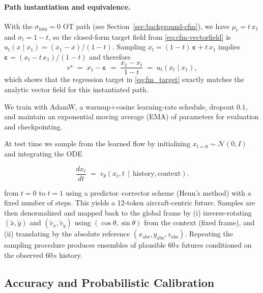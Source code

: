 \documentclass[
  manuscript=proceedings,  %
  layout=preprint,  %
  year=20xx,
  volume=x,
]{extra/joas}
\begin{document}
\paragraph{Path instantiation and equivalence.}
With the $\sigma_{\min}{=}0$ OT path (see Section~\ref{sec:background-cfm}), we have $\mu_t{=}t\,x_1$ and $\sigma_t{=}1{-}t$, so the closed-form target field from \eqref{eq:cfm-vectorfield} is $u_t(x\mid x_1){=}(x_1{-}x)/(1{-}t)$. Sampling $x_t{=}(1{-}t)\,\boldsymbol{\varepsilon}+t\,x_1$ implies $\boldsymbol{\varepsilon}{=}(x_t{-}t\,x_1)/(1{-}t)$ and therefore
\[
v^\star\;=\;x_1 - \boldsymbol{\varepsilon}\;=\;\frac{x_1 - x_t}{1 - t}\;=\;u_t(x_t\mid x_1),
\]
which shows that the regression target in \eqref{eq:fm_target} exactly matches the analytic vector field for this instantiated path.

We train with AdamW, a warmup+cosine learning-rate schedule, dropout $0.1$, and maintain an exponential moving average (EMA) of parameters for evaluation and checkpointing.

At test time we sample from the learned flow by initializing $x_{t=0}\sim\mathcal{N}(0,I)$ and integrating the ODE

\begin{equation}
\frac{d x_t}{d t} \;=\; v_\theta\!\left(x_t, t \,\middle|\, \text{history}, \text{context}\right).
\label{eq:cfm_ode}
\end{equation}

from $t{=}0$ to $t{=}1$ using a predictor--corrector scheme (Heun's method) with a fixed number of steps. This yields a 12-token aircraft-centric future. Samples are then denormalized and mapped back to the global frame by (i) inverse-rotating $(\tilde{x},\tilde{y})$ and $(\tilde{v}_x,\tilde{v}_y)$ using $(\cos\theta,\sin\theta)$ from the context (fixed frame), and (ii) translating by the absolute reference $(x_{\text{abs}},y_{\text{abs}},z_{\text{abs}})$. Repeating the sampling procedure produces ensembles of plausible 60\,s futures conditioned on the observed 60\,s history.

\subsection{Accuracy and Probabilistic Calibration}
\label{subsec:evaluation}
\end{document}

